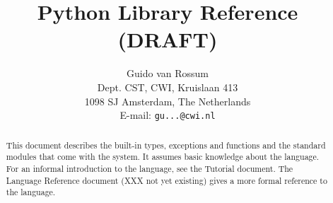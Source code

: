 

\newcommand{\itembreak}{
       \mbox{}\\*[0mm]
}

\newcommand{\funcitem}[2]{\item[#1(#2)]}

\newcommand{\excitem}[2]{
\item[#1 = {\tt '#2'}]
\itembreak
}

\title{\bf
       Python Library Reference \\
       (DRAFT)
}

\author{
       Guido van Rossum \\
       Dept. CST, CWI, Kruislaan 413 \\
       1098 SJ Amsterdam, The Netherlands \\
       E-mail: {\tt gu...@cwi.nl}
}




\maketitle

\begin{abstract}

\noindent
This document describes the built-in types, exceptions and functions and
the standard modules that come with the {\Python} system.
It assumes basic knowledge about the {\Python} language.
For an informal introduction to the language, see the Tutorial document.
The Language Reference document (XXX not yet existing)
gives a more formal reference to the language.

\end{abstract}

\pagebreak

\tableofcontents

\pagebreak







